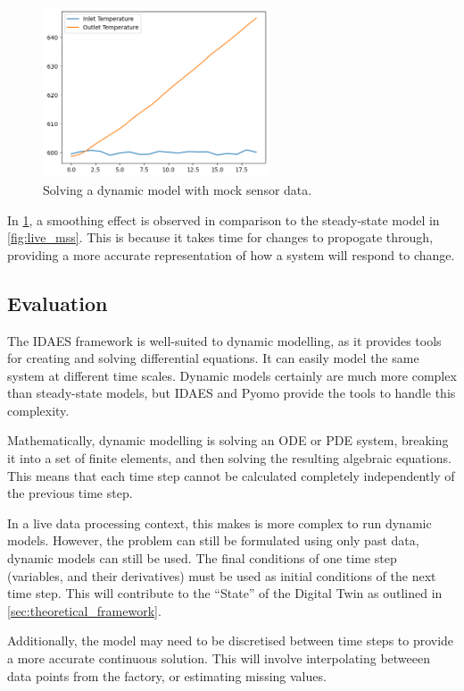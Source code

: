 \documentclass[12pt]{article}
\begin{document}
\begin{figure}[h]
    \centering
    \includegraphics[width=0.6\textwidth]{dynamic_live.png}
    \caption{Solving a dynamic model with mock sensor data.}
    \label{fig:dynamic_live}
\end{figure}

In \cref{fig:dynamic_live}, a smoothing effect is observed in comparison to the steady-state model in \cref{fig:live_mss}. This is because it takes time for changes to propogate through, providing a more accurate representation of how a system will respond to change.

\subsection{Evaluation}
The IDAES framework is well-suited to dynamic modelling, as it provides tools for creating and solving differential equations. It can easily model the same system at different time scales. Dynamic models certainly are much more complex than steady-state models, but IDAES and Pyomo provide the tools to handle this complexity.

Mathematically, dynamic modelling is solving an ODE or PDE system, breaking it into a set of finite elements, and then solving the resulting algebraic equations. This means that each time step cannot be calculated completely independently of the previous time step.

In a live data processing context, this makes is more complex to run dynamic models. 
However, the problem can still be formulated using only past data, dynamic models can still be used.
The final conditions of one time step (variables, and their derivatives) must be used as initial conditions of the next time step. This will contribute to the ``State'' of the Digital Twin as outlined in \cref{sec:theoretical_framework}.

Additionally, the model may need to be discretised between time steps to provide a more accurate continuous solution. This will involve interpolating betweeen data points from the factory, or estimating missing values.
\end{document}
